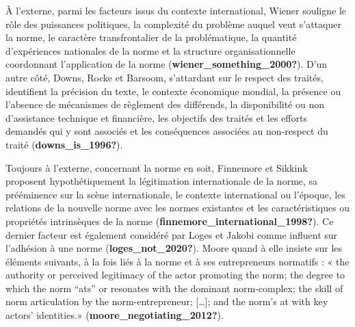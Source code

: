 \documentclass[12pt]{ulaval}
\begin{document}
À l'externe, parmi les facteurs issus du contexte international, Wiener souligne le rôle des puissances politiques, la complexité du problème auquel veut s'attaquer la norme, le caractère transfrontalier de la problématique, la quantité d'expériences nationales de la norme et la structure organisationnelle coordonnant l'application de la norme (\textbf{wiener\_something\_2000?}). D'un autre côté, Downs, Rocke et Barsoom, s'attardant sur le respect des traités, identifient la précision du texte, le contexte économique mondial, la présence ou l'absence de mécanismes de règlement des différends, la disponibilité ou non d'assistance technique et financière, les objectifs des traités et les efforts demandés qui y sont associés et les conséquences associées au non-respect du traité (\textbf{downs\_is\_1996?}).

Toujours à l'externe, concernant la norme en soit, Finnemore et Sikkink proposent hypothétiquement la légitimation internationale de la norme, sa prééminence sur la scène internationale, le contexte international ou l'époque, les relations de la nouvelle norme avec les normes existantes et les caractéristiques ou propriétés intrinsèques de la norme (\textbf{finnemore\_international\_1998?}). Ce dernier facteur est également considéré par Loges et Jakobi comme influent sur l'adhésion à une norme (\textbf{loges\_not\_2020?}). Moore quand à elle insiste sur les éléments suivants, à la fois liés à la norme et à ses entrepreneurs normatifs : « the authority or perceived legitimacy of the actor promoting the norm; the degree to which the norm ``ats'' or resonates with the dominant norm-complex; the skill of norm articulation by the norm-entrepreneur; {[}\ldots{]}; and the norm's at with key actors' identities.» (\textbf{moore\_negotiating\_2012?}).
\end{document}
